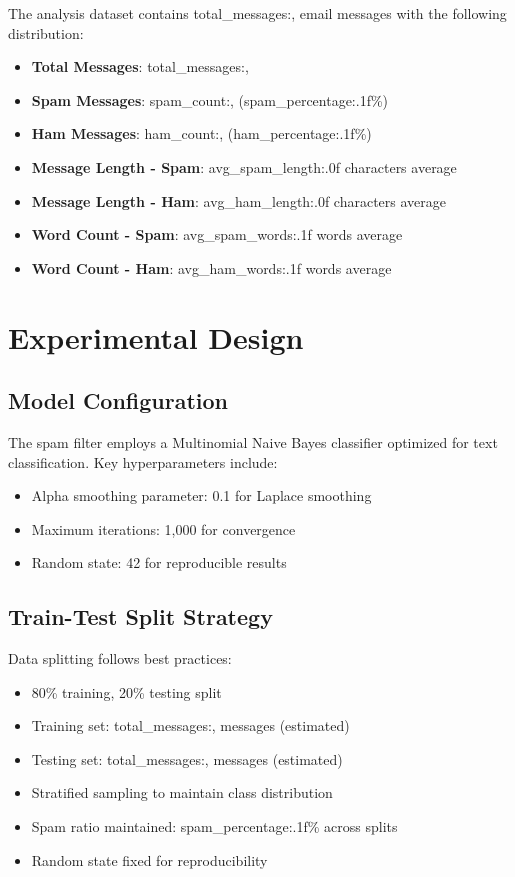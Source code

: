 \documentclass[12pt,a4paper]{article}
\begin{document}
The analysis dataset contains {total_messages:,} email messages with the following distribution:

\begin{itemize}
    \item \textbf{Total Messages}: {total_messages:,}
    \item \textbf{Spam Messages}: {spam_count:,} ({spam_percentage:.1f}\%)
    \item \textbf{Ham Messages}: {ham_count:,} ({ham_percentage:.1f}\%)
    \item \textbf{Message Length - Spam}: {avg_spam_length:.0f} characters average
    \item \textbf{Message Length - Ham}: {avg_ham_length:.0f} characters average
    \item \textbf{Word Count - Spam}: {avg_spam_words:.1f} words average
    \item \textbf{Word Count - Ham}: {avg_ham_words:.1f} words average
\end{itemize}


\section{Experimental Design}

\subsection{Model Configuration}

The spam filter employs a Multinomial Naive Bayes classifier optimized for text classification. Key hyperparameters include:

\begin{itemize}
    \item Alpha smoothing parameter: 0.1 for Laplace smoothing
    \item Maximum iterations: 1,000 for convergence
    \item Random state: 42 for reproducible results
\end{itemize}

\subsection{Train-Test Split Strategy}

Data splitting follows best practices:
\begin{itemize}
    \item 80\% training, 20\% testing split
    \item Training set: {total_messages:,} messages (estimated)
    \item Testing set: {total_messages:,} messages (estimated)
    \item Stratified sampling to maintain class distribution
    \item Spam ratio maintained: {spam_percentage:.1f}\% across splits
    \item Random state fixed for reproducibility
\end{itemize}
\end{document}
